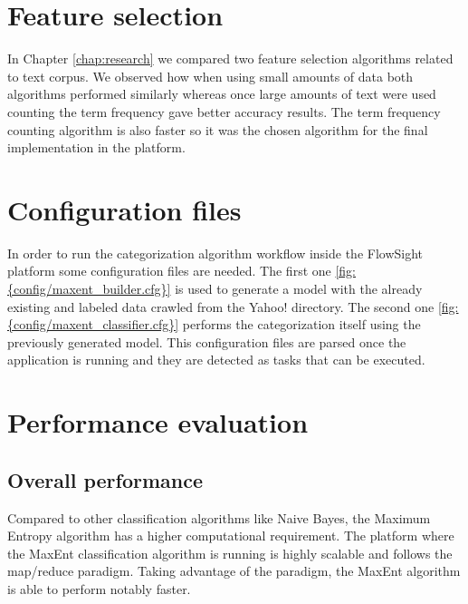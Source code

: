   

\section{Feature selection}
In Chapter \ref{chap:research} we compared two feature selection algorithms related to text corpus. We observed how when using small amounts of data both algorithms performed similarly whereas once
large amounts of text were used counting the term frequency gave better accuracy results. The term frequency counting algorithm is also faster so it was the chosen algorithm for the final 
implementation in the platform.


\section{Configuration files}
\label{sec:config}
In order to run the categorization algorithm workflow inside the FlowSight platform some configuration files are needed. The first one \ref{fig:{config/maxent_builder.cfg}} is used to generate a model with the already existing and labeled
data crawled from the Yahoo! directory. The second one \ref{fig:{config/maxent_classifier.cfg}} performs the categorization itself using the previously generated model. This configuration files are
parsed once the application is running and they are detected as tasks that can be executed.



\clearpage
{}

\section{Performance evaluation}
\subsection{Overall performance}
Compared to other classification algorithms like Naive Bayes, the Maximum Entropy algorithm has a higher computational requirement. 
The platform where the MaxEnt classification algorithm is running is highly scalable and follows the map/reduce paradigm. Taking advantage of the paradigm, the MaxEnt algorithm
is able to perform notably faster.



